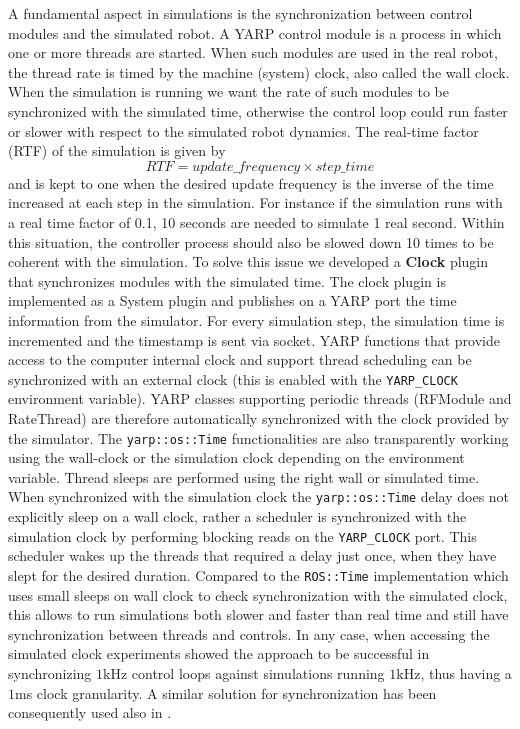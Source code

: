 A fundamental aspect in simulations is the synchronization between control modules and the simulated robot. A YARP control module is a process in which one or more threads are started. When such modules are used in the real robot, the thread rate is timed by the machine (system) clock, also called the wall clock. When the simulation is running we want the rate of such modules to be synchronized with the simulated time, otherwise the control loop could run faster or slower with respect to the simulated robot dynamics.
The real-time factor (RTF) of the simulation is given by 
\begin{equation}
    RTF = update\_frequency \times step\_time
\end{equation}
and is kept to one when the desired update frequency is the inverse of the time increased at each step in the simulation.
For instance if the simulation runs with a real time factor of 0.1, 10 seconds are needed to simulate 1 real second. Within this situation, the controller process should also be slowed down 10 times to be coherent with the simulation. To solve this issue we developed a \textbf{Clock} plugin that synchronizes modules with the simulated time.
The clock plugin is implemented as a System plugin and publishes on a YARP port the time information from the simulator. For every simulation step, the simulation time is incremented and the timestamp is sent via socket.
YARP functions that provide access to the computer internal clock and support thread scheduling can be synchronized with an external clock (this is enabled with the \texttt{YARP\_CLOCK} environment variable). YARP classes supporting periodic threads (RFModule and RateThread) are therefore automatically synchronized with the clock provided by the simulator. The \texttt{yarp::os::Time} functionalities are also transparently working using the wall-clock or the simulation clock depending on the environment variable. Thread sleeps are performed using the right wall or simulated time.
When synchronized with the simulation clock the \texttt{yarp::os::Time} delay does not explicitly sleep on a wall clock, rather a scheduler is synchronized with the simulation clock by performing blocking reads on the \texttt{YARP\_CLOCK} port. This scheduler wakes up the threads that required a delay just once, when they have slept for the desired duration. Compared to the \texttt{ROS::Time} implementation which uses small sleeps on wall clock to check synchronization with the simulated clock, this allows to run simulations both slower and faster than real time and still have synchronization between threads and controls. In any case, when accessing the simulated clock experiments showed the approach to be successful in synchronizing $1$kHz control loops against simulations running $1$kHz, thus having a $1$ms clock granularity.
A similar solution for synchronization has been consequently used also in \cite{Eljaik:14}.

